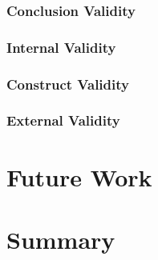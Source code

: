 \documentclass[a4paper,10pt]{article}
\begin{document}
\subsubsection{Conclusion Validity}

\subsubsection{Internal Validity}

\subsubsection{Construct Validity}

\subsubsection{External Validity}

\section{Future Work}

\section{Summary}

\newpage



\end{document}
